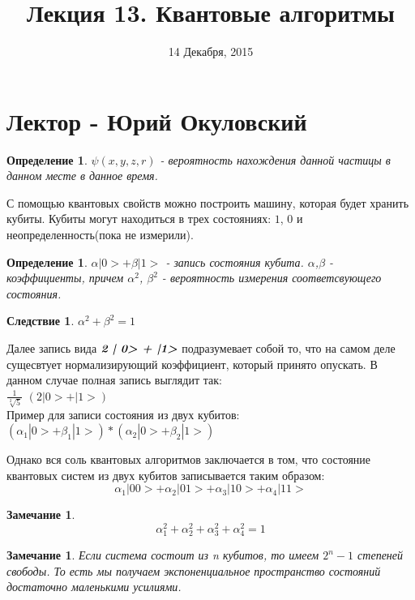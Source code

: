 \documentclass{beamer}
\title{Лекция 13. Квантовые алгоритмы}
\date{14 Декабря, 2015}
\theoremstyle{plain}
\newtheorem{rmk}[thm]{Замечание}
\newtheorem{sled}[thm]{Следствие}
\newtheorem{dfn}[thm]{Определение}
\theoremstyle{definition}
\begin{document}


\section{Лектор - Юрий Окуловский}
\begin{frame}
    \begin{dfn}
        $\psi(x, y, z, r)$ - вероятность нахождения данной частицы в данном месте в данное время.
    \end{dfn}
    С помощью квантовых свойств можно построить машину, которая будет хранить кубиты. Кубиты могут находиться в трех состояниях: $1$, $0$ и неопределенность(пока не измерили).
    \begin{dfn}
        $\alpha | 0> + \beta|1>$ - запись состояния кубита. $\alpha$,$\beta$ - коэффициенты, причем $\alpha^2$, $\beta^2$ - вероятность измерения соответсвующего состояния.
    \end{dfn}
    \begin{sled}
        $\alpha^2 +\beta^2 = 1$
    \end{sled}
\end{frame}

\begin{frame}
    Далее запись вида $\textbf{\textit{2 | 0> + |1>}}$ подразумевает собой то, что на самом деле сущесвтует нормализирующий коэффициент, который принято опускать. В данном случае полная запись выглядит так: \\
    $\frac{1}{\sqrt[2]{5}}$ $(2 | 0> + | 1 >)$ \\
    \vspace{\baselineskip}
    Пример для записи состояния из двух кубитов:\\
    $(\alpha_1 | 0> + \beta_1 | 1>)*(\alpha_2 | 0> + \beta_2 | 1>)$
\end{frame}

\begin{frame}
    Однако вся соль квантовых алгоритмов заключается в том, что состояние квантовых систем из двух кубитов записывается таким образом:
    $$ \alpha_1 | 00> + \alpha_2 | 01> + \alpha_3 | 10> + \alpha_4 | 11> $$
    \begin{rmk}
        $$ \alpha_1^2 + \alpha_2^2 + \alpha_3^2 + \alpha_4^2 = 1 $$
    \end{rmk}
    \begin{rmk}
        Если система состоит из n кубитов, то имеем $2^n - 1$ степеней свободы. То есть мы получаем экспоненциальное пространство состояний достаточно маленькими усилиями.
    \end{rmk}
\end{frame}
\end{document}
